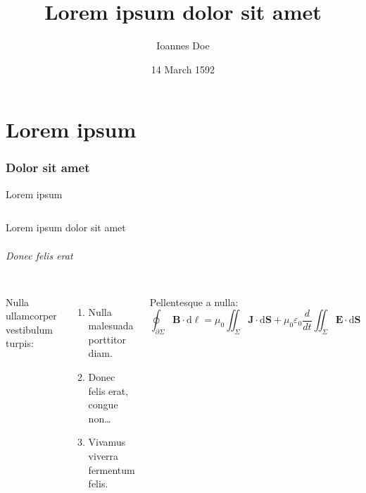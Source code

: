 \documentclass[aspectratio=169]{beamer}
\title{Lorem ipsum dolor sit amet}
\date{14 March 1592}
\institute{University of Maximegalon}
\author{Ioannes Doe}
\begin{document}

\begin{frame}
\titlepage
\end{frame}


\part{Lorem ipsum}
\frame{\partpage}


\section{Dolor sit amet}
\frame{\sectionpage}


\begin{frame}{Lorem ipsum}%
	\begin{columns}%
			\setlength{\parskip}{1ex}%
			\justifying%
			\lipsum[2]
	\end{columns}%
\end{frame}


\begin{frame}{Lorem ipsum dolor sit amet}%
	\framesubtitle{Donec felis erat}%
	\begin{columns}%
		\column{0.95\textwidth}%
			\setlength{\parskip}{1ex}%
			\justifying%
			Nulla ullamcorper vestibulum turpis:
			\begin{enumerate}
				\item Nulla malesuada porttitor diam.
				\item Donec felis erat, congue non\dots
				\item Vivamus viverra fermentum felis.
			\end{enumerate}

			Pellentesque a nulla:
			\begin{equation*}
				\oint_{\partial \Sigma} \mathbf{B} \cdot \mathrm{d}\boldsymbol{\ell} = \mu_0 \iint_{\Sigma} \mathbf{J}
				\cdot \mathrm{d}\mathbf{S} + \mu_0 \varepsilon_0 \frac{d}{dt} \iint_{\Sigma} \mathbf{E}
				\cdot \mathrm{d}\mathbf{S}
			\end{equation*}
	\end{columns}%
\end{frame}
\end{document}
